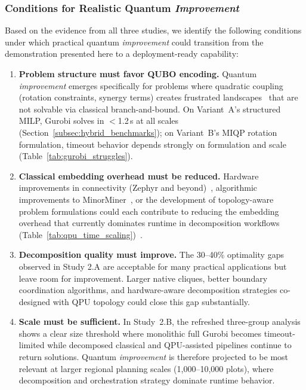 \documentclass{oqireport}
\begin{document}
\subsubsection{Conditions for Realistic Quantum \textit{Improvement}}

Based on the evidence from all three studies, we identify the following conditions under which practical quantum \textit{improvement} could transition from the demonstration presented here to a deployment-ready capability:

\begin{enumerate}
    \item \textbf{Problem structure must favor QUBO encoding.} Quantum \textit{improvement} emerges specifically for problems where quadratic coupling (rotation constraints, synergy terms) creates frustrated landscapes~\cite{barahona1982computational, lucasIsingFormulationsMany2014} that are not solvable via classical branch-and-bound. On Variant~A's structured MILP, Gurobi solves in $<$1.2\,s at all scales (Section~\ref{subsec:hybrid_benchmarks}); on Variant~B's MIQP rotation formulation, timeout behavior depends strongly on formulation and scale (Table~\ref{tab:gurobi_struggles}).

    \item \textbf{Classical embedding overhead must be reduced.} Hardware improvements in connectivity (Zephyr and beyond)~\cite{boothby2021zephyr}, algorithmic improvements to MinorMiner~\cite{cai2014practical}, or the development of topology-aware problem formulations could each contribute to reducing the embedding overhead that currently dominates runtime in decomposition workflows (Table~\ref{tab:qpu_time_scaling})~\cite{zbinden2020embedding}.

    \item \textbf{Decomposition quality must improve.} The 30--40\% optimality gaps observed in Study 2.A are acceptable for many practical applications but leave room for improvement. Larger native cliques, better boundary coordination algorithms, and hardware-aware decomposition strategies co-designed with QPU topology could close this gap substantially.

    \item \textbf{Scale must be sufficient.} In Study~2.B, the refreshed three-group analysis shows a clear size threshold where monolithic full Gurobi becomes timeout-limited while decomposed classical and QPU-assisted pipelines continue to return solutions. Quantum \textit{improvement} is therefore projected to be most relevant at larger regional planning scales (1,000--10,000 plots), where decomposition and orchestration strategy dominate runtime behavior.
\end{enumerate}
\end{document}
